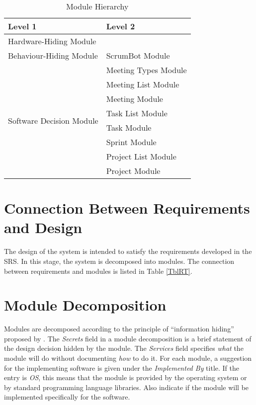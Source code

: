 \documentclass[12pt, titlepage]{article}
\begin{document}
\begin{table}[h!]
\centering
\begin{tabular}{p{} p{}}
\toprule
\textbf{Level 1} & \textbf{Level 2}\\
\midrule

{Hardware-Hiding Module} & ~ \\
\midrule

\multirow{1}{0.3\textwidth}{Behaviour-Hiding Module} 
& ScrumBot Module\\         %
\midrule

\multirow{8}{0.3\textwidth}{Software Decision Module} 
& Meeting Types Module\\    %
& Meeting List Module\\     %
& Meeting Module\\          %
& Task List Module\\        %
& Task Module\\             %
& Sprint Module\\           %
& Project List Module\\     %
& Project Module\\          %
\bottomrule

\end{tabular}
\caption{Module Hierarchy}
\label{TblMH}
\end{table}

\section{Connection Between Requirements and Design} \label{SecConnection}

The design of the system is intended to satisfy the requirements developed in
the SRS. In this stage, the system is decomposed into modules. The connection
between requirements and modules is listed in Table \ref{TblRT}.

\section{Module Decomposition} \label{SecMD}

Modules are decomposed according to the principle of ``information hiding'' proposed by \citet{ParnasEtAl1984}. The \emph{Secrets} field in a module decomposition is a brief statement of the design decision hidden by the module. The \emph{Services} field specifies \emph{what} the module will do without documenting \emph{how} to do it. For each module, a suggestion for the implementing software is given under the \emph{Implemented By} title. If the entry is \emph{OS}, this means that the module is provided by the operating system or by standard programming language libraries.  Also indicate if the module will be implemented specifically for the software.
\end{document}
